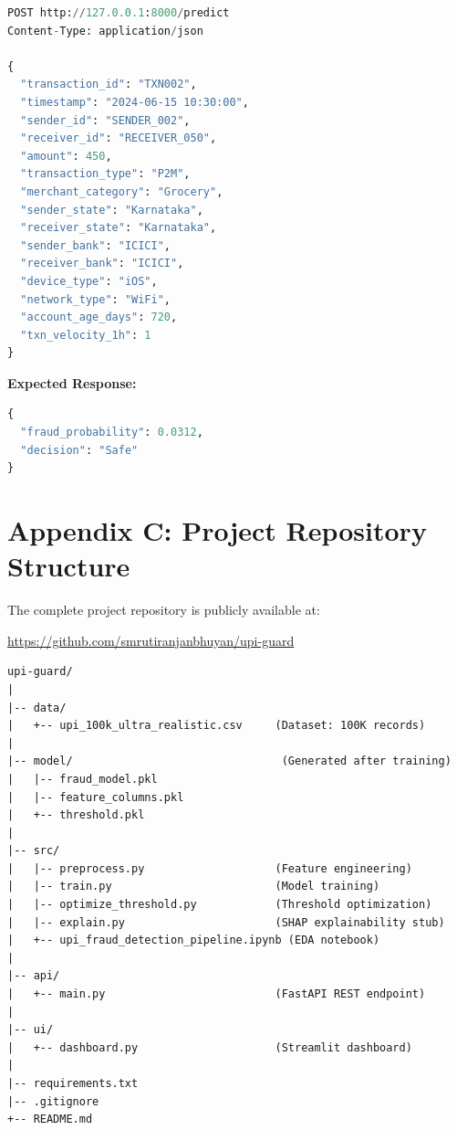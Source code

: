 \begin{lstlisting}[language=Python, caption={Low-risk transaction API call}]
POST http://127.0.0.1:8000/predict
Content-Type: application/json

{
  "transaction_id": "TXN002",
  "timestamp": "2024-06-15 10:30:00",
  "sender_id": "SENDER_002",
  "receiver_id": "RECEIVER_050",
  "amount": 450,
  "transaction_type": "P2M",
  "merchant_category": "Grocery",
  "sender_state": "Karnataka",
  "receiver_state": "Karnataka",
  "sender_bank": "ICICI",
  "receiver_bank": "ICICI",
  "device_type": "iOS",
  "network_type": "WiFi",
  "account_age_days": 720,
  "txn_velocity_1h": 1
}
\end{lstlisting}

\textbf{Expected Response:}

\begin{lstlisting}[language=Python, caption={API response for low-risk transaction}]
{
  "fraud_probability": 0.0312,
  "decision": "Safe"
}
\end{lstlisting}

\chapter*{Appendix C: Project Repository Structure}

The complete project repository is publicly available at:

\url{https://github.com/smrutiranjanbhuyan/upi-guard}

\begin{verbatim}
upi-guard/
|
|-- data/
|   +-- upi_100k_ultra_realistic.csv     (Dataset: 100K records)
|
|-- model/                                (Generated after training)
|   |-- fraud_model.pkl
|   |-- feature_columns.pkl
|   +-- threshold.pkl
|
|-- src/
|   |-- preprocess.py                    (Feature engineering)
|   |-- train.py                         (Model training)
|   |-- optimize_threshold.py            (Threshold optimization)
|   |-- explain.py                       (SHAP explainability stub)
|   +-- upi_fraud_detection_pipeline.ipynb (EDA notebook)
|
|-- api/
|   +-- main.py                          (FastAPI REST endpoint)
|
|-- ui/
|   +-- dashboard.py                     (Streamlit dashboard)
|
|-- requirements.txt
|-- .gitignore
+-- README.md
\end{verbatim}
